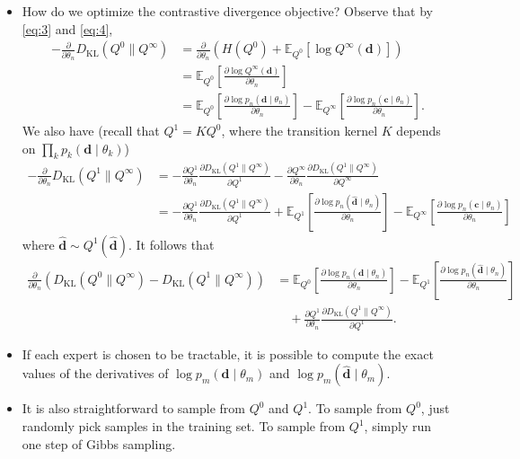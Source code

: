 \documentclass[10pt]{article}
\newcommand{\EE}{\mathbb{E}}
\newcommand{\KL}{D_{\text{KL}}}
\begin{document}
\begin{itemize}
\item How do we optimize the contrastive divergence objective? Observe that by \eqref{eq:3} and \eqref{eq:4},
\begin{align*}
- \frac{\partial}{\partial \theta_n} \KL(Q^0 \| Q^\infty) &= \frac{\partial}{\partial \theta_n} (H(Q^0) + \EE_{Q^0}[\log Q^\infty(\mathbf{d})]) \\
&= \EE_{Q^0} \left[ \frac{\partial \log Q^\infty(\mathbf{d})}{\partial \theta_n} \right] \\
&= \EE_{Q^0} \left[ \frac{\partial \log p_n(\mathbf{d} \mid \theta_n)}{\partial \theta_n} \right] - \EE_{Q^\infty} \left[ \frac{\partial \log p_n(\mathbf{c} \mid \theta_n)}{\partial \theta_n} \right].
\end{align*}
We also have (recall that $Q^1 = KQ^0$, where the transition kernel $K$ depends on $\prod_k p_k(\mathbf{d} \mid \theta_k)$) 
\begin{align*}
- \frac{\partial}{\partial \theta_n} \KL(Q^1 \| Q^\infty) &= - \frac{\partial Q^1}{\partial \theta_n} \frac{\partial \KL(Q^1 \| Q^\infty)}{\partial Q^1} - \frac{\partial Q^\infty}{\partial \theta_n} \frac{\partial \KL(Q^1 \| Q^\infty)}{\partial Q^\infty} \\
&= - \frac{\partial Q^1}{\partial \theta_n} \frac{\partial \KL(Q^1 \| Q^\infty)}{\partial Q^1} + \EE_{Q^1} \left[ \frac{\partial \log p_n(\mathbf{\hat{\mathbf{d}}} \mid \theta_n)}{\partial \theta_n} \right] - \EE_{Q^\infty} \left[ \frac{\partial \log p_n(\mathbf{c} \mid \theta_n)}{\partial \theta_n} \right]
\end{align*}
where $\mathbf{\hat{d}} \sim Q^1(\mathbf{\hat{d}})$. It follows that
\begin{align}
\frac{\partial}{\partial \theta_n} (\KL(Q^0\|Q^\infty) - \KL(Q^1\|Q^\infty)) &= \EE_{Q^0} \left[ \frac{\partial \log p_n(\mathbf{d} \mid \theta_n)}{\partial \theta_n} \right] - \EE_{Q^1} \left[ \frac{\partial \log p_n(\mathbf{\hat{\mathbf{d}}} \mid \theta_n)}{\partial \theta_n} \right] \nonumber \\
&\quad + \frac{\partial Q^1}{\partial \theta_n} \frac{\partial \KL(Q^1 \| Q^\infty)}{\partial Q^1}. \label{eq:5}
\end{align}
\item If each expert is chosen to be tractable, it is possible to compute the exact values of the derivatives of $\log p_m(\mathbf{d} \mid \theta_m)$ and $\log p_m(\mathbf{\hat{d}} \mid \theta_m)$.
\item It is also straightforward to sample from $Q^0$ and $Q^1$. To sample from $Q^0$, just randomly pick samples in the training set. To sample from $Q^1$, simply run one step of Gibbs sampling.

\end{itemize}
\end{document}
